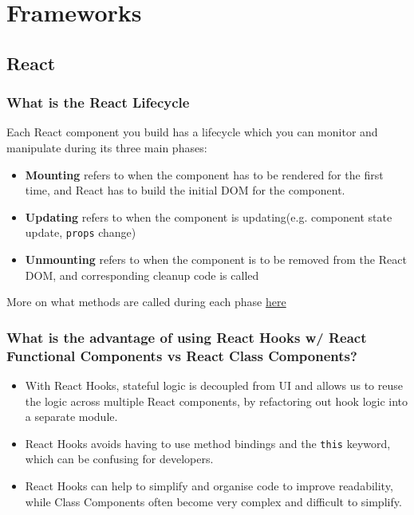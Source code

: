 \documentclass[12pt, a4paper]{article}
\newcommand{\code}[1]{\texttt{#1}}
\begin{document}
\pagebreak

\section*{Frameworks}

\subsection*{React}

\subsubsection*{What is the React Lifecycle}
Each React component you build has a lifecycle which you can monitor and manipulate during its three main phases:
\begin{itemize}
  \item \textbf{Mounting} refers to when the component has to be rendered for the first time, and React has to build the initial DOM for the component.
  \item \textbf{Updating} refers to when the component is updating(e.g. component state update, \code{props} change)
  \item \textbf{Unmounting} refers to when the component is to be removed from the React DOM, and corresponding cleanup code is called
\end{itemize}

More on what methods are called during each phase \href{https://www.w3schools.com/react/react_lifecycle.asp}{here}

\subsubsection*{What is the advantage of using React Hooks w/ React Functional Components vs React Class Components?}
\begin{itemize}
  \item With React Hooks, stateful logic is decoupled from UI and allows us to reuse the logic across multiple React components, by refactoring out hook logic into a separate module.
  \item React Hooks avoids having to use method bindings and the \code{this} keyword, which can be confusing for developers.
  \item React Hooks can help to simplify and organise code to improve readability, while Class Components often become very complex and difficult to simplify.
\end{itemize}
\end{document}
